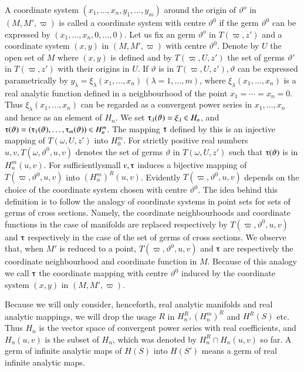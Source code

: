 A coordinate system $(x_1,  \ldots,  x_n,  y_1,  \ldots,  y_m)$ around
the origin of \break $\vartheta^o$ in $(M, M',  \varpi)$ is called a
coordinate system with 
centre $\vartheta^0$ if the germ $\vartheta^0$ can be expressed by
$(x_1,  \ldots,  x_n,  0,  \ldots,  0)$. Let us fix an germ
$\vartheta^o$ in $T(\varpi,  z')$ and a coordinate system $(x, y)$ in
$(M, M',  \varpi)$ with centre $\vartheta^0$. Denote by $U$ the open
set of $M$ where $(x, y)$ is defined and by $T(\varpi,  U,  z')$ the
set of germs $\vartheta'$ in $T(\varpi, z')$ with their origins in
$U$. If $\vartheta$ is in $T(\varpi,  U,  z'), \vartheta$ can be
expressed parametrically by $y_\lambda = \xi_\lambda (x_1,  \ldots,
x_n) ~ (\lambda =1,  \ldots,  m)$,  where $\xi_\lambda (x_1,  \ldots,
x_n)$ is a real analytic function defined in a neighbourhood of the
point $x_1 = \cdots = x_n = 0$. Thus $\xi_\lambda (x_1,  \ldots,
x_n)$ can be regarded as a convergent power series in $x_1,  \ldots,
x_n$ and hence as an element of $H_n$. We set $\tauup_\lambda
(\vartheta) = \xi_\lambda \in H_n$,  and $\tauup (\vartheta) =
(\tauup_1(\vartheta),  \ldots,  \tauup_m (\vartheta)) \in H^m_n$. The
mapping $\tauup$ defined by this is an injective mapping of $T(\omega,
U,  z')$ into $H^m_0$. For strictly positive real numbers $u, v,
T(\omega,  \vartheta^0,  u, v)$ denotes the set of  germs $\vartheta$
in $T(\omega,  U, z')$ such that $\tauup(\vartheta)$ is in $H^m_n(u,
v)$. For sufficiently\pageoriginale small $v,  \tauup$ induces a bijective mapping
of $T(\varpi,  \vartheta^0,  u, v)$ into $(H^m_n)^R (u, v)$. Evidently
$T(\varpi,  \vartheta^0,  u, v)$ depends on the choice of the
coordinate system chosen with centre $\vartheta^0$. The idea behind
this definition is to follow the analogy of coordinate systems in
point sets for sets of germs of cross sections. Namely,  the
coordinate neighbourhoods and coordinate functions in the case of
manifolds are replaced respectively by $T(\varpi,  \vartheta^0,  u,
v)$ and $\tauup$ respectively in the case of the set of germs of cross
sections. We observe that,  when $M'$ is reduced to a point,
$T(\varpi,  \vartheta^0,  u, v)$ and $\tauup$ are respectively the
coordinate neighbourhood and coordinate function in $M$. Because of
this analogy we call $\tauup$ the coordinate mapping with centre
$\vartheta^0$ induced by the coordinate system $(x, y)$ in $(M, M',
\varpi)$. 

Because we will only consider,  henceforth,  real analytic manifolds
and real analytic mappings,  we will drop the usage $R$ in  $H^R_n,
(H^m_n)^R$ and $H^R(S)$ etc. Thus $H_n$ is the vector space of
convergent power series with real coefficients,  and $H_n(u, v)$ is
the subset of $H_n$,  which was denoted by $H^R_n \cap H_n (u, v)$ so
far. A germ of  infinite analytic maps of $H(S)$ into $H(S')$ means a
germ of real infinite analytic maps. 

